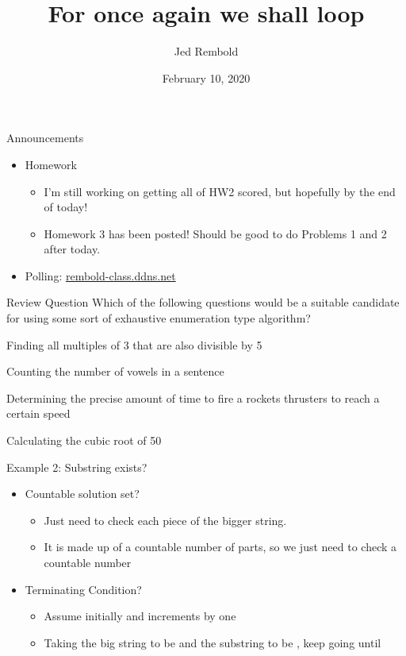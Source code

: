 \documentclass[pdf, aspectratio=169, 12pt]{beamer}
\title{For once again we shall loop}
\author{Jed Rembold}
\date{February 10, 2020}
\begin{document}
\begin{frame}{Announcements}
	\begin{itemize}
		\item Homework
			\begin{itemize}
				\item I'm still working on getting all of HW2 scored, but hopefully by the end of today!
				\item Homework 3 has been posted! Should be good to do Problems 1 and 2 after today.
			\end{itemize}
		\item Polling: \url{rembold-class.ddns.net}
	\end{itemize}
\end{frame}

\begin{frame}{Review Question}
	Which of the following questions would be a suitable candidate for using some sort of exhaustive enumeration type algorithm?
	\begin{poll}
	\item Finding all multiples of 3 that are also divisible by 5
	\item Counting the number of vowels in a sentence
	\item Determining the precise amount of time to fire a rockets thrusters to reach a certain speed
	\item Calculating the cubic root of 50
	\end{poll}
\end{frame}

\begin{frame}{Example 2: Substring exists?}
	\begin{itemize}
		\item Countable solution set?
			\begin{itemize}
				\item Just need to check each piece of the bigger string.
				\item It is made up of a countable number of parts, so we just need to check a countable number
			\end{itemize}
		\item Terminating Condition?
			\begin{itemize}
				\item Assume  initially and increments by one
				\item Taking the big string to be  and the substring to be , keep going until
					\begin{center}
					\end{center}
			\end{itemize}
	\end{itemize}
\end{frame}
\end{document}

